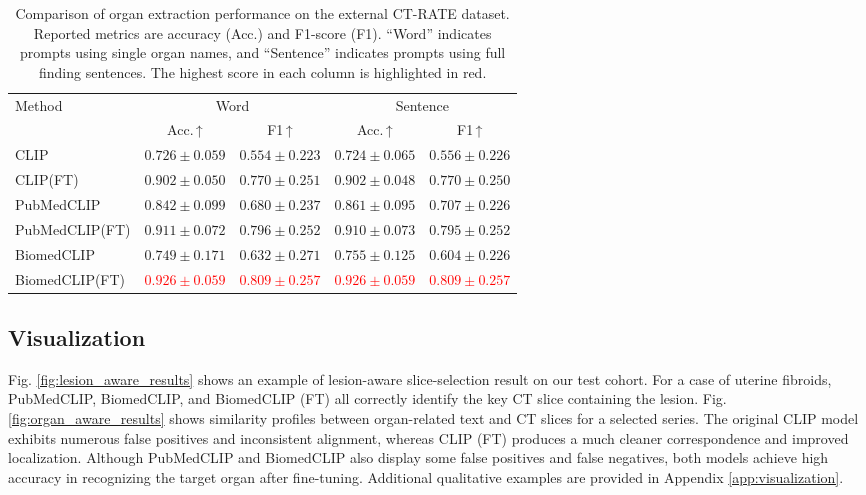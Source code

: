 \documentclass[bioengineering,article,submit,pdftex,moreauthors]{Definitions/mdpi}
\begin{document}
\begin{table}[ht]
  \centering
  \caption{ Comparison of organ extraction performance on the external CT-RATE dataset. 
  Reported metrics are accuracy (Acc.) and F1-score (F1). 
  “Word” indicates prompts using single organ names, and “Sentence” indicates prompts using full finding sentences. 
  The highest score in each column is highlighted in red.}
  \label{tab:organ_extraction_results_ctrate}
  \begin{tabular}{lcccc}
    \toprule
    \multirow{2}{*}{Method} & \multicolumn{2}{c}{Word}               & \multicolumn{2}{c}{Sentence}           \\
    \cmidrule(lr){2-3}\cmidrule(lr){4-5}
                          & Acc.\,↑ & F1\,↑         & Acc.\,↑   & F1\,↑         \\ 
    \midrule
    CLIP                    & $0.726\pm0.059$ & $0.554\pm0.223$ & $0.724\pm0.065$ & $0.556\pm0.226$ \\
    CLIP(FT)                & $0.902\pm0.050$ & $0.770\pm0.251$ & $0.902\pm0.048$ & $0.770\pm0.250$ \\
    PubMedCLIP              & $0.842\pm0.099$ & $0.680\pm0.237$ & $0.861\pm0.095$ & $0.707\pm0.226$ \\
    PubMedCLIP(FT)          & $0.911\pm0.072$ & $0.796\pm0.252$ & $0.910\pm0.073$ & $0.795\pm0.252$ \\
    BiomedCLIP              & $0.749\pm0.171$ & $0.632\pm0.271$ & $0.755\pm0.125$ & $0.604\pm0.226$ \\
    BiomedCLIP(FT)          & \textcolor{red}{$0.926\pm0.059$} & \textcolor{red}{$0.809\pm0.257$} & \textcolor{red}{$0.926\pm0.059$} & \textcolor{red}{$0.809\pm0.257$} \\
    \bottomrule
  \end{tabular}
\end{table}


\subsection{Visualization}\label{sec:visualization}
Fig. \ref{fig:lesion_aware_results} shows an example of lesion-aware slice-selection result on our test cohort. 
For a case of uterine fibroids, PubMedCLIP, BiomedCLIP, and BiomedCLIP (FT) all correctly identify the key CT slice containing the lesion.
Fig. \ref{fig:organ_aware_results} shows similarity profiles between organ-related text and CT slices for a selected series. 
The original CLIP model exhibits numerous false positives and inconsistent alignment, whereas CLIP (FT) produces a much cleaner correspondence and improved localization. 
Although PubMedCLIP and BiomedCLIP also display some false positives and false negatives, both models achieve high accuracy in recognizing the target organ after fine-tuning. 
Additional qualitative examples are provided in Appendix \ref{app:visualization}.
\end{document}
